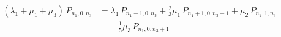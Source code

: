 \[
\begin{aligned}
  (\lambda_{1} + \mu_{1} + \mu_{3})\,P_{n_{1},0,n_{3}} &= \lambda_{1}\,P_{n_{1}-1,0,n_{3}} + \tfrac{2}{3}\mu_{1}\,P_{n_{1}+1,0,n_{3}-1} + \mu_{2}\,P_{n_{1},1,n_{3}}\\
  &\quad + \tfrac{1}{5}\mu_{3}\,P_{n_{1},0,n_{3}+1}
\end{aligned}
\]
